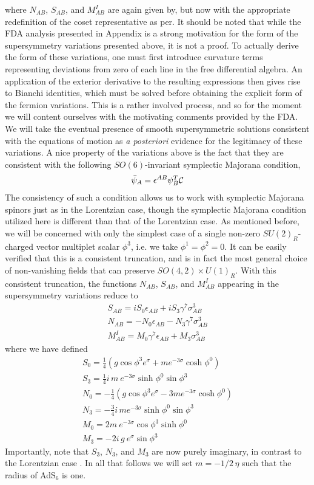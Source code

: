\documentclass[12pt]{article}
\begin{document}
where $N_{AB}$, $S_{AB}$, and $M^I_{AB}$ are again given by, but now with the appropriate redefinition of the coset representative as per. It should be noted that while the FDA analysis presented in Appendix  is a strong motivation for the form of the supersymmetry variations presented above, it is not a proof. To actually derive the form of these variations, one must first introduce curvature terms representing deviations from zero of each line in the free differential algebra. An application of the exterior derivative to the resulting expressions then gives rise to Bianchi identities, which must be solved before obtaining the explicit form of the fermion variations. This is a rather involved process, and so for the moment we will content ourselves with the motivating comments provided by the FDA. We will take the eventual presence of smooth supersymmetric solutions consistent with the equations of motion as \textit{a posteriori} evidence for the legitimacy of these variations.
A nice property of the variations above is the fact that they are consistent with the following $SO(6)$-invariant symplectic Majorana condition, 
\begin{eqnarray}
\bar \psi_A = \epsilon^{AB} \psi_B^T {\cal C}
\end{eqnarray}
The consistency of such a condition allows us to work with symplectic Majorana spinors just as in the Lorentzian case, though the symplectic Majorana condition utilized here is different than that of the Lorentzian case.
As mentioned before, we will be concerned with only the simplest case of a single non-zero $SU(2)_R$-charged vector multiplet scalar $\phi^3$, i.e. we take $\phi^1=\phi^2=0$. It can be easily verified that this is a
consistent truncation, and is in fact the most general choice of non-vanishing fields that can preserve $SO(4, 2) \times U(1)_R$. With this consistent truncation, the functions $N_{AB}$, $S_{AB}$, and $M^I_{AB}$ appearing in the supersymmetry variations reduce to 
\begin{eqnarray}
S_{AB} = i S_0 \epsilon_{AB} + i S_3 \gamma^7 \sigma^3_{AB}
\nonumber\\
N_{AB}= -N_0 \epsilon_{AB} -N_3 \gamma^7 \sigma^3_{AB}
\nonumber\\
M^I_{AB}= M_0 \gamma^7 \epsilon_{AB} + M_3  \sigma^3_{AB}
\end{eqnarray}
where we have defined 
\begin{eqnarray}
S_0=\frac14 \left(g\cos \phi^3 e^\sigma+m e^{-3\sigma}\cosh \phi^0\right)
\nonumber\\
S_3=\frac14 i \,m ~e^{-3\sigma}\sinh \phi^0 \sin \phi^3
\nonumber\\
N_0=-\frac14 \left(g\cos \phi^3 e^\sigma-3m e^{-3\sigma}\cosh \phi^0\right)
\nonumber\\
N_3=-\frac34 i\, m e^{-3\sigma}\sinh \phi^0 \sin \phi^3
\nonumber\\
M_0=2m ~e^{-3\sigma}\cos \phi^3\sinh \phi^0
\nonumber\\
M_3=-2 i\, g ~e^{\sigma}\sin \phi^3
\end{eqnarray}
Importantly, note that $S_3$, $N_3$, and $M_3$ are now purely imaginary, in contrast to the Lorentzian case . In all that follows we will set $m=-1/2\, \eta$ such that the radius of AdS$_6$ is one.
\end{document}
